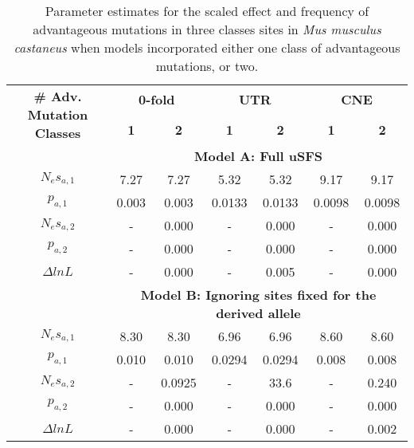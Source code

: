 \begin{table}[h!]
\centering
\caption[Parameter estimates for the scaled effect and frequency of advantageous mutations in three classes sites]{Parameter estimates for the scaled effect and frequency of advantageous mutations in three classes sites in \textit{Mus musculus castaneus} when models incorporated either one class of advantageous mutations, or two. }

\begin{adjustbox}{max width=\textwidth}

 \begin{tabular}{c c c c c c c} 
\toprule
\multirow{2}{*}{\textbf{\# Adv. Mutation Classes}} &	\multicolumn{2}{c}{\textbf{0-fold}}	& \multicolumn{2}{c}{\textbf{UTR}}	& \multicolumn{2}{c}{\textbf{CNE}} \\ \cline{2-7}
	& \textbf{1} &	\textbf{2} &	\textbf{1} &	\textbf{2} &\textbf{	1} &\textbf{	2} \\ \hline 
 &	\multicolumn{6}{c}{\textbf{Model A: Full uSFS}} \\ \hline
$N_es_{a,1}$	 & 7.27	& 7.27	& 5.32	& 5.32	 & 9.17	 & 9.17 \\
$p_{a,1}$ &	0.003	& 0.003	& 0.0133 & 	0.0133 &	0.0098 &	0.0098 \\
$N_es_{a,2}$ & 	- &	0.000 &	- &	0.000 &	- &	0.000 \\
$p_{a,2}$ &	-	& 0.000	& -	& 0.000 &	- &	0.000 \\
$\Delta lnL$ &	-	 & 0.000 &	-	& 0.005	& - &	0.000 \\ \hline
 &	\multicolumn{6}{c}{\textbf{Model B: Ignoring sites fixed for the derived allele}} \\ \hline
$N_es_{a,1}$ &	8.30	 & 8.30	& 6.96	& 6.96	& 8.60	& 8.60 \\
$p_{a,1}$ &	0.010 &	0.010	& 0.0294 &	0.0294	& 0.008 &	0.008 \\
$N_es_{a,2}$ &	- &	0.0925 &	- &	33.6	 & - &	0.240 \\
$p_{a,2}$ &	- &	0.000 &	- &	0.000 &	- &	0.000 \\
$\Delta lnL$  &	- &	0.000 &	- &	0.000 	& - &	0.002 \\
\bottomrule
\end{tabular}
\end{adjustbox}

\label{tab:C3S5}
\end{table}